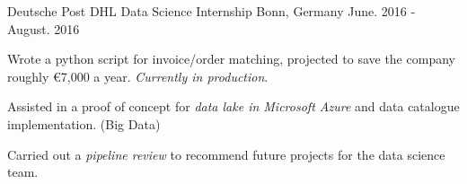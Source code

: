 

\begin{cventries}

  \cventry
    {Deutsche Post DHL} %
    {Data Science Internship} %
    {Bonn, Germany} %
    {June. 2016 - August. 2016} %
    {
      \begin{cvitems} %
        \item{Wrote a python script for invoice/order matching, projected to save the company roughly €7,000 a year. \textit{Currently in production}.}
        \item{Assisted in a proof of concept for \textit{data lake in Microsoft Azure} and data catalogue implementation. (Big Data)}
        \item{Carried out a \textit{pipeline review} to recommend future projects for the data science team.}
      \end{cvitems}
    }

\end{cventries}
